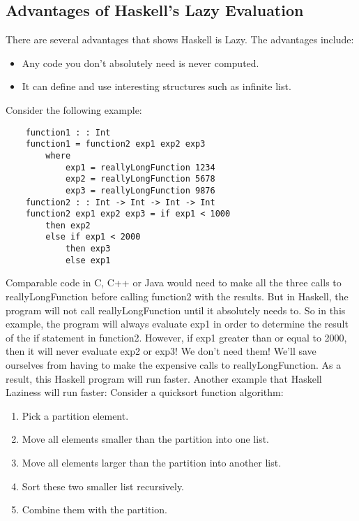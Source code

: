 \documentclass{article}
\begin{document}
\subsection{Advantages of Haskell's Lazy Evaluation}
There are several advantages that shows Haskell is Lazy. The advantages include: 
\begin{itemize}
  \item Any code you don't absolutely need is never computed.
  \item It can define and use interesting structures such as infinite list.
\end{itemize}
Consider the following example:
\begin{lstlisting}
	function1 : : Int
 	function1 = function2 exp1 exp2 exp3
		where
			exp1 = reallyLongFunction 1234
			exp2 = reallyLongFunction 5678
			exp3 = reallyLongFunction 9876
	function2 : : Int -> Int -> Int -> Int
	function2 exp1 exp2 exp3 = if exp1 < 1000
		then exp2
		else if exp1 < 2000
			then exp3
			else exp1
\end{lstlisting}
Comparable code in C, C++ or Java would need to make all the three calls to reallyLongFunction before calling function2 with the results. But in Haskell, the program will not call reallyLongFunction until it absolutely needs to.
\newline \newline So in this example, the program will always evaluate exp1 in order to determine the result of the if statement in function2. However, if exp1 greater than or equal to 2000, then it will never evaluate exp2 or exp3! We don’t need them! We’ll save ourselves from having to make the expensive calls to reallyLongFunction. As a result, this Haskell program will run faster.
\newline\newline Another example that Haskell Laziness will run faster:
\newline\newline Consider a quicksort function algorithm:
\begin{enumerate}
	\item Pick a partition element.
	\item Move all elements smaller than the partition into one list.
	\item Move all elements larger than the partition into another list.
	\item Sort these two smaller list recursively.
	\item Combine them with the partition.
\end{enumerate}
\end{document}
